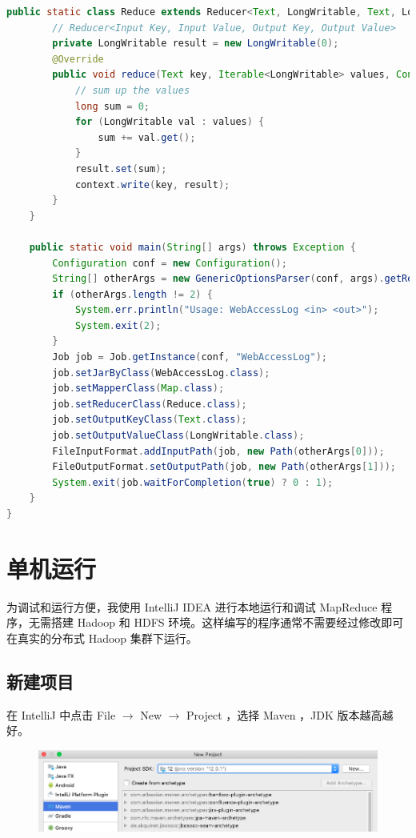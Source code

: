 \documentclass{article}
\begin{document}
\begin{lstlisting}[language=java]
    public static class Reduce extends Reducer<Text, LongWritable, Text, LongWritable> {
        // Reducer<Input Key, Input Value, Output Key, Output Value>
        private LongWritable result = new LongWritable(0);
        @Override
        public void reduce(Text key, Iterable<LongWritable> values, Context context) throws IOException, InterruptedException {
            // sum up the values
            long sum = 0;
            for (LongWritable val : values) {
                sum += val.get();
            }
            result.set(sum);
            context.write(key, result);
        }
    }

    public static void main(String[] args) throws Exception {
        Configuration conf = new Configuration();
        String[] otherArgs = new GenericOptionsParser(conf, args).getRemainingArgs(); // Input folder & Output folder
        if (otherArgs.length != 2) {
            System.err.println("Usage: WebAccessLog <in> <out>");
            System.exit(2);
        }
        Job job = Job.getInstance(conf, "WebAccessLog");
        job.setJarByClass(WebAccessLog.class);
        job.setMapperClass(Map.class);
        job.setReducerClass(Reduce.class);
        job.setOutputKeyClass(Text.class);
        job.setOutputValueClass(LongWritable.class);
        FileInputFormat.addInputPath(job, new Path(otherArgs[0]));
        FileOutputFormat.setOutputPath(job, new Path(otherArgs[1]));
        System.exit(job.waitForCompletion(true) ? 0 : 1);
    }
}
\end{lstlisting}

\section{单机运行}

为调试和运行方便，我使用 IntelliJ IDEA 进行本地运行和调试 MapReduce 程序，无需搭建 Hadoop 和 HDFS 环境。这样编写的程序通常不需要经过修改即可在真实的分布式 Hadoop 集群下运行。

\subsection{新建项目}

在 IntelliJ 中点击 File $\rightarrow$ New $\rightarrow$ Project ，选择 Maven ，JDK 版本越高越好。

\begin{figure}[!ht]
\centering
\includegraphics[scale=0.46]{image/5.png}
\end{figure}
\end{document}
